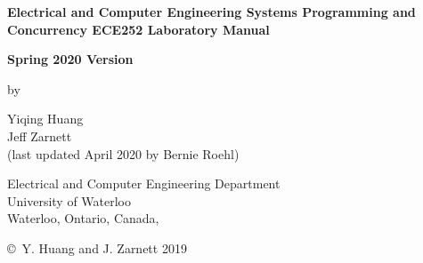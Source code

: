 \pagestyle{empty}

\begin{titlepage}
        \begin{center}
        \vspace*{1.0cm}

        \Huge{\bf Electrical and Computer Engineering Systems Programming and Concurrency ECE252 Laboratory Manual}

        \Large{\bf Spring 2020 Version}

        \vspace*{1.0cm}

        \normalsize
        by \\

        \vspace*{1.0cm}

        \Large
        Yiqing Huang \\
        Jeff Zarnett \\
        (last updated April 2020 by Bernie Roehl)

        \vspace*{3.0cm}

        \normalsize
        Electrical and Computer Engineering Department \\
        University of Waterloo \\ 

        \vspace*{2.0cm}
\makeatletter
        Waterloo, Ontario, Canada, \@date \\
\makeatother
        
      
        
        \vspace*{1.0cm}

        \copyright\ Y. Huang and J. Zarnett 2019 \\
        \end{center}
\end{titlepage}

\pagestyle{plain}
\setcounter{page}{2}

